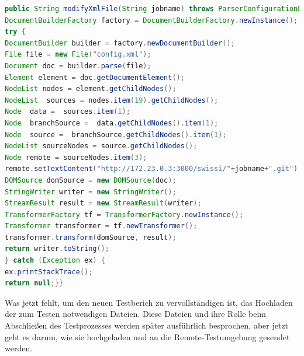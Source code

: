 \documentclass[a4paper,12pt,oneside]{book}
\begin{document}
\begin{lstlisting}[language=JAVA,caption=modifyXmlFil]
public String modifyXmlFile(String jobname) throws ParserConfigurationException, SAXException, IOException {
DocumentBuilderFactory factory = DocumentBuilderFactory.newInstance();
try {
DocumentBuilder builder = factory.newDocumentBuilder();
File file = new File("config.xml");
Document doc = builder.parse(file);
Element element = doc.getDocumentElement();
NodeList nodes = element.getChildNodes();
NodeList  sources = nodes.item(19).getChildNodes();
Node  data =  sources.item(1);
Node  branchSource =  data.getChildNodes().item(1);
Node  source =  branchSource.getChildNodes().item(1);
NodeList sourceNodes = source.getChildNodes();
Node remote = sourceNodes.item(3);
remote.setTextContent("http://172.23.0.3:3000/swissi/"+jobname+".git");
DOMSource domSource = new DOMSource(doc);
StringWriter writer = new StringWriter();
StreamResult result = new StreamResult(writer);
TransformerFactory tf = TransformerFactory.newInstance();
Transformer transformer = tf.newTransformer();
transformer.transform(domSource, result);
return writer.toString();    
} catch (Exception ex) {
ex.printStackTrace();
return null;}}
\end{lstlisting} 
Was jetzt fehlt, um den neuen Testberich zu vervollständigen ist, das Hochladen der zum Testen notwendigen Dateien. Diese Dateien und ihre Rolle beim Abschließen des Testprozesses werden später ausführlich besprochen, aber jetzt geht es darum, wie sie hochgeladen und an die Remote-Testumgebung gesendet werden.
\end{document}
